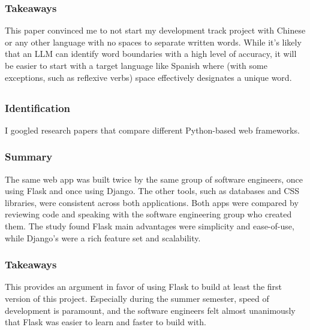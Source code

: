 \documentclass[
	letterpaper, %
]{jdf}
\begin{document}
\subsubsection{Takeaways}
This paper convinced me to not start my development track project with Chinese or any other language with no spaces to separate written words. While it's likely that an LLM can identify word boundaries with a high level of accuracy, it will be easier to start with a target language like Spanish where (with some exceptions, such as reflexive verbs) space effectively designates a unique word.

\subsection{}
\subsubsection{Identification}
I googled research papers that compare different Python-based web frameworks.

\subsubsection{Summary}
The same web app was built twice by the same group of software engineers, once using Flask and once using Django. The other tools, such as databases and CSS libraries, were consistent across both applications. Both apps were compared by reviewing code and speaking with the software engineering group who created them. The study found Flask main advantages were simplicity and ease-of-use, while Django's were a rich feature set and scalability.

\subsubsection{Takeaways}
This provides an argument in favor of using Flask to build at least the first version of this project. Especially during the summer semester, speed of development is paramount, and the software engineers felt almost unanimously that Flask was easier to learn and faster to build with.
\end{document}
